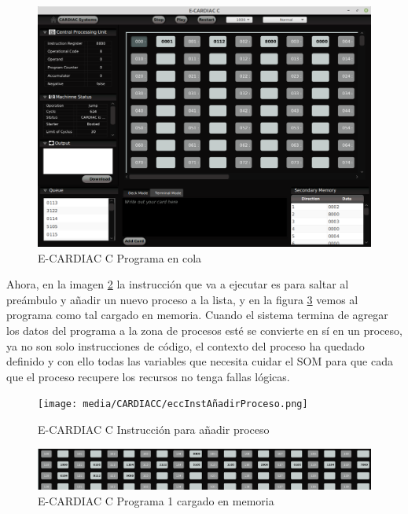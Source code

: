 \documentclass[letterpaper,12pt,oneside]{book}
\begin{document}
		\begin{figure}[h]		
			\centering
			\includegraphics[scale=0.4]{media/CARDIACC/eccProgramaenCola.png}
			\caption{E-CARDIAC C Programa en cola}
			\label{fig:eccProgramaEnCola}
		\end{figure}	
		
		Ahora, en la imagen \ref{fig:eccAddNewProcesInst} la instrucción que va a ejecutar es para saltar al preámbulo y añadir un nuevo proceso a la lista,
		y en la figura \ref{fig:eccPrograma1Cargado} vemos al programa como tal cargado en memoria. Cuando el sistema termina de agregar los datos del
		programa a la zona de procesos esté se convierte en sí en un proceso, ya no son solo instrucciones de código, el contexto del proceso ha quedado definido
		y con ello todas las variables que necesita cuidar el SOM para que cada que el proceso recupere los recursos no tenga fallas lógicas.
        \begin{figure}[h]		
			\centering
			\texttt{[image: media/CARDIACC/eccInstAñadirProceso.png]}
			\caption{E-CARDIAC C Instrucción para añadir proceso}
			\label{fig:eccAddNewProcesInst}
		\end{figure}

        \begin{figure}[h]		
			\centering
			\includegraphics[scale=0.25]{media/CARDIACC/eccPrograma1Cargado.png}
			\caption{E-CARDIAC C Programa 1 cargado en memoria}
			\label{fig:eccPrograma1Cargado}
		\end{figure}	
  
\end{document}
